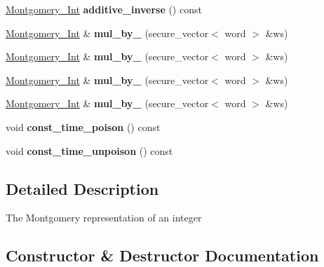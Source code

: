 \begin{DoxyCompactItemize}
\hyperlink{class_botan_1_1_montgomery___int}{Montgomery\+\_\+\+Int} {\bfseries additive\+\_\+inverse} () const
\item 
\mbox{\label{class_botan_1_1_montgomery___int_a630810025635725737f68b5eee6d3046}} 
\hyperlink{class_botan_1_1_montgomery___int}{Montgomery\+\_\+\+Int} \& {\bfseries mul\+\_\+by\+\_} (secure\+\_\+vector$<$ word $>$ \&ws)
\item 
\mbox{\label{class_botan_1_1_montgomery___int_ac1fdf884a6b58dc0730c24012891dc49}} 
\hyperlink{class_botan_1_1_montgomery___int}{Montgomery\+\_\+\+Int} \& {\bfseries mul\+\_\+by\+\_} (secure\+\_\+vector$<$ word $>$ \&ws)
\item 
\mbox{\label{class_botan_1_1_montgomery___int_ac6228397ef44a758f9a0c8b6958b0a61}} 
\hyperlink{class_botan_1_1_montgomery___int}{Montgomery\+\_\+\+Int} \& {\bfseries mul\+\_\+by\+\_} (secure\+\_\+vector$<$ word $>$ \&ws)
\item 
\mbox{\label{class_botan_1_1_montgomery___int_af0d0976c9e178e03200b58412391daa7}} 
\hyperlink{class_botan_1_1_montgomery___int}{Montgomery\+\_\+\+Int} \& {\bfseries mul\+\_\+by\+\_} (secure\+\_\+vector$<$ word $>$ \&ws)
\item 
\mbox{\label{class_botan_1_1_montgomery___int_a88483a5fe1f2b2617efae821d7682c5c}} 
void {\bfseries const\+\_\+time\+\_\+poison} () const
\item 
\mbox{\label{class_botan_1_1_montgomery___int_ac49ee67b58c3eb80d5f7b5ded43b54a1}} 
void {\bfseries const\+\_\+time\+\_\+unpoison} () const
\end{DoxyCompactItemize}


\subsection{Detailed Description}
The Montgomery representation of an integer 

\subsection{Constructor \& Destructor Documentation}
\mbox{\label{class_botan_1_1_montgomery___int_a129cc27370aacbb8cc3f56c75239efce}} 
